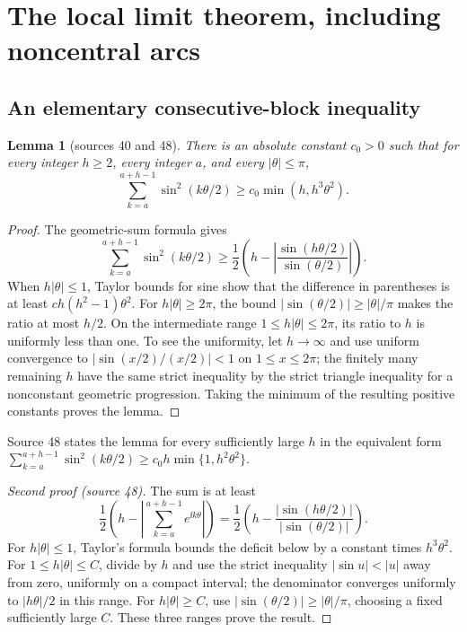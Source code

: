 \documentclass[11pt]{article}
\numberwithin{equation}{section}
\newtheorem{lemma}[theorem]{Lemma}
\theoremstyle{definition}\newtheorem{definition}[theorem]{Definition}
\theoremstyle{remark}\newtheorem{remark}[theorem]{Remark}
\newcommand{\src}[1]{\textup{(source #1)}}
\begin{document}
\section{The local limit theorem, including noncentral arcs}\label{dpn:sec:llt}
\subsection{An elementary consecutive-block inequality}
\begin{lemma}[sources 40 and 48]\label{dpn:lem:block}
There is an absolute constant $c_0>0$ such that for every integer $h\ge2$,
every integer $a$, and every $|\theta|\le\pi$,
\begin{equation}\label{dpn:eq:block}
 \sum_{k=a}^{a+h-1}\sin^2(k\theta/2)
       \ge c_0\min(h,h^3\theta^2).
\end{equation}
\end{lemma}
\begin{proof}
The geometric-sum formula gives
\[
 \sum_{k=a}^{a+h-1}\sin^2(k\theta/2)
 \ge\frac12\left(h-
       \left|\frac{\sin(h\theta/2)}{\sin(\theta/2)}\right|\right).
\]
When $h|\theta|\le1$, Taylor bounds for sine show that the difference in
parentheses is at least $c h(h^2-1)\theta^2$.
For $h|\theta|\ge2\pi$, the bound
$|\sin(\theta/2)|\ge|\theta|/\pi$ makes the ratio at most $h/2$.
On the intermediate range $1\le h|\theta|\le2\pi$, its ratio to $h$ is
uniformly less than one. To see the uniformity, let $h\to\infty$ and use
uniform convergence to $|\sin(x/2)/(x/2)|<1$ on $1\le x\le2\pi$;
the finitely many remaining $h$ have the same strict inequality by the
strict triangle inequality for a nonconstant geometric progression.
Taking the minimum of the resulting positive constants proves the lemma.
\end{proof}

Source 48 states the lemma for every sufficiently large $h$ in the equivalent
form $\sum_{k=a}^{a+h-1}\sin^2(k\theta/2)\ge c_0h\min\{1,h^2\theta^2\}$.
\begin{proof}[Second proof \src{48}]
The sum is at least
\[
 \frac12\left(h-\left|\sum_{k=a}^{a+h-1}e^{\ii k\theta}\right|\right)
 =\frac12\left(h-\frac{|\sin(h\theta/2)|}{|\sin(\theta/2)|}\right).
\]
For $h|\theta|\le1$, Taylor's formula bounds the deficit below by a constant
times $h^3\theta^2$. For $1\le h|\theta|\le C$, divide by $h$ and use the
strict inequality $|\sin u|<|u|$ away from zero, uniformly on a compact
interval; the denominator converges uniformly to $|h\theta|/2$ in this range.
For $h|\theta|\ge C$, use $|\sin(\theta/2)|\ge|\theta|/\pi$, choosing a fixed
sufficiently large $C$. These three ranges prove the result.
\end{proof}
\end{document}
